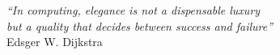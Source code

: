 \cleardoublepage
\thispagestyle{plain}

\vspace*{8cm}

\begin{flushright}
   \textsl{``In computing, elegance is not a dispensable luxury \\
              but a quality that decides between success and failure''} \\
\vspace*{1.5cm}
            Edsger W. Dijkstra
\end{flushright}
